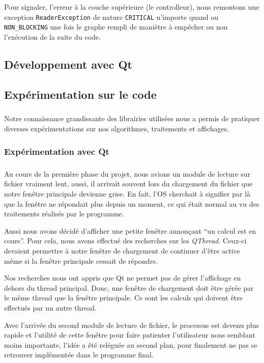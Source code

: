 Pour signaler, l'erreur à la couche supérieure (le controlleur), nous remontons une exception \verb|ReaderException| de nature \verb|CRITICAL| n'importe quand ou \verb|NON_BLOCKING| une fois le graphe rempli de maniètre à empêcher ou non l'exécution de la suite du code.


\subsection{D\'eveloppement avec Qt}



\subsection{Expérimentation sur le code}
\subparagraph{}
Notre connaissance grandissante des librairies utilisées nous a permis de pratiquer diverses expérimentations sur nos algorithmes, traitements et affichages.
\subsubsection{Expérimentation avec Qt}
\subparagraph{}
Au cours de la premi\`ere phase du projet, nous avions un module de lecture sur fichier vraiment lent, aussi, il arrivait souvent lors du chargement du fichier que notre fen\^etre principale devienne grise. En fait, l'OS cherchait \`a signifier par l\`a que la fen\^etre ne répondait plus depuis un moment, ce qui était normal au vu des traitements réalisés par le programme.

Aussi nous avons décidé d'afficher une petite fen\^etre annon\c cant ``un calcul est en cours''. Pour cela, nous avons effectué des recherches sur les \textit{QThread}. Ceux-ci devaient permettre \`a notre fen\^etre de chargement de continuer d'\^etre active m\^eme si la fen\^etre principale cessait de répondre.

Nos recherches nous ont appris que Qt ne permet pas de gérer l'affichage en dehors du thread principal. Donc, une fen\^etre de chargement doit être g\'er\'ee par le m\^eme thread que la fen\^etre principale. Ce sont les calculs qui doivent \^etre effectu\'es par un autre thread.

Avec l'arriv\'ee du second module de lecture de fichier, le processus est devenu plus rapide et l'utilit\'e de cette fen\^etre pour faire patienter l'utilisateur nous semblant moins importante, l'id\'ee a été rel\'egu\'ee au second plan, pour finalement ne pas se retrouver impl\'ement\'ee dans le programme final.

